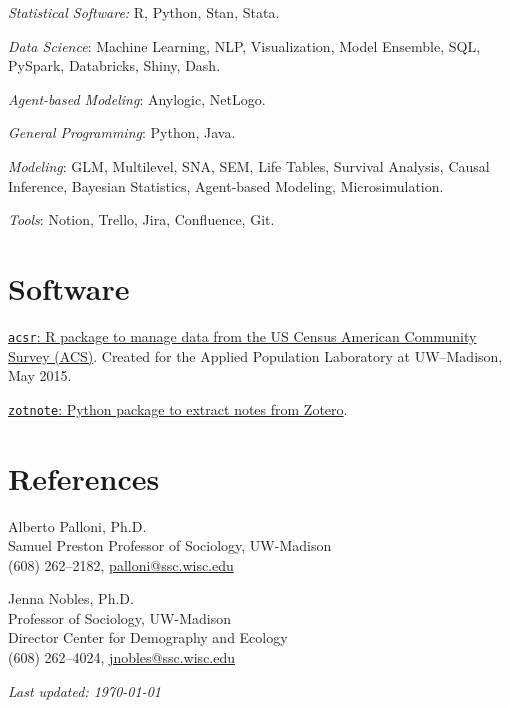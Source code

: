 \documentclass[10pt,letterpaper]{article}
\renewenvironment{itemize}{
  \begin{list}{}{
    \setlength{\leftmargin}{1.5em}
    \setlength{\itemsep}{0.25em}
    \setlength{\parskip}{0pt}
    \setlength{\parsep}{0.25em}
  }
}{
  \end{list}
}
\begin{document}
\begin{itemize}
\item \textit{Statistical Software:} R, Python, Stan, Stata.
\item \textit{Data Science}: Machine Learning, NLP, Visualization, Model Ensemble, SQL, PySpark, Databricks, Shiny, Dash.
\item \textit{Agent-based Modeling}: Anylogic, NetLogo.
\item \textit{General Programming}: Python, Java.
\item \textit{Modeling}: GLM, Multilevel, SNA, SEM, Life Tables, Survival Analysis, Causal Inference, Bayesian Statistics, Agent-based Modeling, Microsimulation. 
\item \textit{Tools}: Notion, Trello, Jira, Confluence, Git.
\end{itemize}

\section*{Software}

\begin{itemize}
\item \href{https://github.com/sdaza/acsr}{\texttt{acsr}: R package to manage data from the US Census American Community Survey (ACS)}. Created for the Applied Population Laboratory at UW--Madison, May 2015.
\item \href{https://github.com/sdaza/zotnote}{\texttt{zotnote}: Python package to extract notes from Zotero}.
\end{itemize}

\section*{References}

\begin{itemize}
\item Alberto Palloni, Ph.D.\\
Samuel Preston Professor of Sociology, UW-Madison\\
(608) 262--2182, \href{mailto:palloni@ssc.wisc.edu}{palloni@ssc.wisc.edu}

\item Jenna Nobles, Ph.D.\\
Professor of Sociology, UW-Madison\\
Director Center for Demography and Ecology\\
(608) 262--4024, \href{mailto:jnobles@ssc.wisc.edu}{jnobles@ssc.wisc.edu}
\end{itemize}

\bigskip
\bigskip
\begin{center}
  \begin{small}
    \textit{Last updated: \today}
  \end{small}
\end{center}

\end{document}
